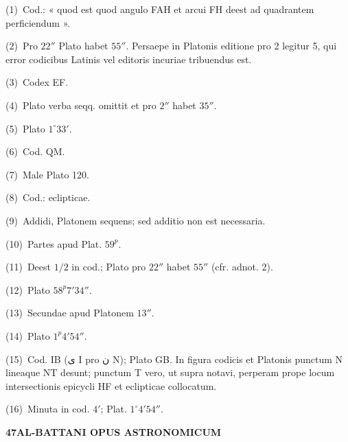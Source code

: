 \documentclass[10pt]{article}
\newcommand{\A}[1]{\hypertarget{#1}{}}
\newcommand{\NN}[2]{\par\noindent\textup{(#1)}\ #2}
\newcommand{\AR}[1]{\textarabic{#1}}
\newcommand{\SP}[3]{%
  \clearpage
  \A{AB01-PDF#1}%
  \begin{center}\textbf{#2\quad #3}\end{center}%
}
\begin{document}
\begin{multicols}{2}
\footnotesize

\A{AB01-PDF0135-N01}
\NN{1}{Cod.: « quod est quod angulo FAH et arcui FH deest
ad quadrantem perficiendum ».}

\A{AB01-PDF0135-N02}
\NN{2}{Pro $22''$ Plato habet $55''$. Persaepe in Platonis
editione pro 2 legitur 5, qui error codicibus Latinis vel
editoris incuriae tribuendus est.}

\A{AB01-PDF0135-N03}
\NN{3}{Codex EF.}

\A{AB01-PDF0135-N04}
\NN{4}{Plato verba seqq. omittit et pro $2''$ habet $35''$.}

\A{AB01-PDF0135-N05}
\NN{5}{Plato $1^\circ33'$.}

\A{AB01-PDF0135-N06}
\NN{6}{Cod. QM.}

\A{AB01-PDF0135-N07}
\NN{7}{Male Plato 120.}

\A{AB01-PDF0135-N08}
\NN{8}{Cod.: eclipticae.}

\A{AB01-PDF0135-N09}
\NN{9}{Addidi, Platonem sequens; sed additio non est necessaria.}

\A{AB01-PDF0135-N10}
\NN{10}{Partes apud Plat. $59^{p}$.}

\A{AB01-PDF0135-N11}
\NN{11}{Deest $1/2$ in cod.; Plato pro $22''$ habet $55''$
(cfr. adnot. 2).}

\A{AB01-PDF0135-N12}
\NN{12}{Plato $58^{p}7'34''$.}

\A{AB01-PDF0135-N13}
\NN{13}{Secundae apud Platonem $13''$.}

\A{AB01-PDF0135-N14}
\NN{14}{Plato $1^{p}4'54''$.}

\A{AB01-PDF0135-N15}
\NN{15}{Cod. IB (\AR{ى} I pro \AR{ن} N); Plato GB.
In figura codicis et Platonis punctum N lineaque NT desunt;
punctum T vero, ut supra notavi, perperam prope locum
intersectionis epicycli HF et eclipticae collocatum.}

\A{AB01-PDF0135-N16}
\NN{16}{Minuta in cod. $4'$; Plat. $1^\circ4'54''$.}

\end{multicols}


\SP{0136}{47}{AL-BATTANI OPUS ASTRONOMICUM}
\end{document}
